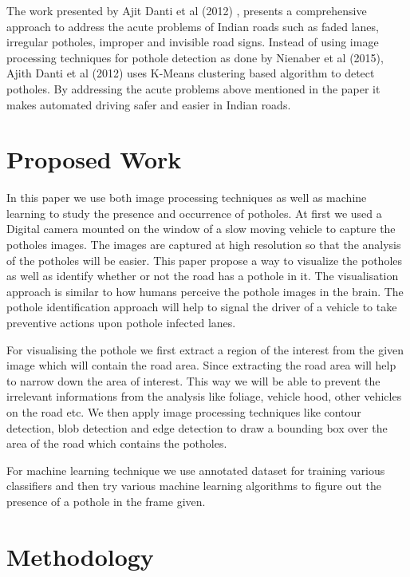 \documentclass[journal]{IEEEtran}
\begin{document}
\vspace*{.5cm}

The work presented by Ajit Danti et al (2012) \cite{papertwo}, presents a comprehensive approach to address the acute problems of Indian roads such as faded lanes, irregular potholes, improper and invisible road signs. Instead of using image processing techniques for pothole detection as done by Nienaber et al (2015), Ajith Danti et al (2012) uses K-Means clustering based algorithm to detect potholes. By addressing the acute problems above mentioned in the paper it makes automated driving safer and easier in Indian roads. 

\section{Proposed Work}
In this paper we use both image processing techniques as well as machine learning to study the presence and occurrence of potholes. At first we used a Digital camera mounted on the window of a slow moving vehicle to capture the potholes images. The images are captured at high resolution so that the analysis of the potholes will be easier. This paper propose a way to visualize the potholes as well as identify whether or not the road has a pothole in it. The visualisation approach is similar to how humans perceive the pothole images in the brain. The pothole identification approach will help to signal the driver of a vehicle to take preventive actions upon pothole infected lanes.

For visualising the pothole we first extract a region of the interest from the given image which will contain the road area. Since extracting the road area will help to narrow down the area of interest. This way we will be able to prevent the irrelevant informations from the analysis like foliage, vehicle hood, other vehicles on the road etc. We then apply image processing techniques like contour detection, blob detection and edge detection to draw a bounding box over the area of the road which contains the potholes.

For machine learning technique we use annotated dataset \cite{dataset} for training various classifiers and then try various machine learning algorithms to figure out the presence of a pothole in the frame given.

\section{Methodology}
\end{document}
